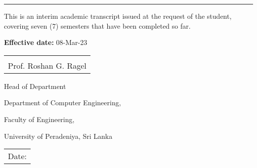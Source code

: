 \documentclass[12pt]{article}
\makeatletter
\newcommand{\sign}[1]{%
  \begin{tabular}[t]{@{}l@{}}
  \makebox[2.5in]{\dotfill}\\
  \strut#1\strut
  \end{tabular}%
}
\newcommand{\Date}{%
  \begin{tabular}[t]{@{}p{2.5in}@{}}
  \\[-2ex]
  \strut Date: \dotfill\strut
  \end{tabular}%
}
\makeatother
\begin{document}
%
%
%  


\noindent\rule{\textwidth}{1pt}
\vspace{5pt}
This is an interim academic transcript issued at the request of the student, covering seven (7) semesters that have been completed so far.
\vspace{5pt}

\noindent\textbf{Effective date:} 08-Mar-23

\vspace{45pt}

\noindent
\begin{minipage}[t]{0.5\linewidth}
    \raggedright
    \sign{Prof. Roshan G. Ragel}
    \par
    Head of Department\par
    Department of Computer Engineering, \par
    Faculty of Engineering, \par
    University of Peradeniya, Sri Lanka
\end{minipage}%
\hfill
  \begin{minipage}[t]{0.4\linewidth}
    \Date
  \end{minipage}
\end{document}
